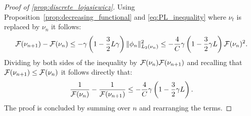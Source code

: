 \begin{proof}[Proof of \cref{prop:discrete_lojasiewicz}]\label{proof:prop:discrete_lojasiewicz}
Using Proposition~\cref{prop:decreasing_functional} and \cref{eq:PL_inequality} where $\nu_t$ is replaced by $\nu_n$ it follows:
$$
{{\mathcal F}}(\nu_{n+1}) - {{\mathcal F}}(\nu_n) \leq -\gamma\left(1-\frac{3}{2} L\gamma\right)\|\phi_n\|_{L_2(\nu_n)}^2 \leq -\frac{4}{C}\gamma\left(1-\frac{3}{2}\gamma L\right){{\mathcal F}}(\nu_n)^2.
$$
Dividing by both sides of the inequality by  $ {{\mathcal F}}(\nu_n){{\mathcal F}}(\nu_{n+1})$ and recalling that ${{\mathcal F}}(\nu_{n+1})\leq {{\mathcal F}}(\nu_n)$ it follows directly that: 
$$\frac{1}{{{\mathcal F}}(\nu_n)} - \frac{1}{{{\mathcal F}}(\nu_{n+1})} \leq -\frac{4}{C}\gamma\left(1-\frac{3}{2}\gamma L\right).$$ The proof is concluded by summing over $n$ and rearranging the terms. 
\end{proof}






%


